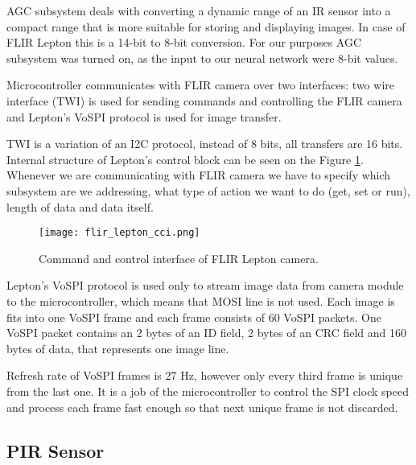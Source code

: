 AGC subsystem deals with converting a dynamic range of an IR sensor into a compact range that is more suitable for storing and displaying images.
In case of FLIR Lepton this is a 14-bit to 8-bit conversion.
For our purposes AGC subsystem was turned on, as the input to our neural network were 8-bit values.

Microcontroller communicates with FLIR camera over two interfaces: two wire interface (TWI) is used for sending commands and controlling the FLIR camera and Lepton's VoSPI protocol is used for image transfer.

TWI is a variation of an I2C protocol, instead of 8 bits, all transfers are 16 bits.
Internal structure of Lepton's control block can be seen on the Figure \ref{flir_lepton_cci}.
Whenever we are communicating with FLIR camera we have to specify which subsystem are we addressing, what type of action we want to do (get, set or run), length of data and data itself.

\begin{figure}[ht]
        \centering
        \texttt{[image: flir\_lepton\_cci.png]} 
        \caption{ Command and control interface of FLIR Lepton camera.} 
        \label{flir_lepton_cci}
\end{figure}

Lepton's VoSPI protocol is used only to stream image data from camera module to the microcontroller, which means that MOSI line is not used.
Each image is fits into one VoSPI frame and each frame consists of 60 VoSPI packets.
One VoSPI packet contains an 2 bytes of an ID field, 2 bytes of an CRC field and 160 bytes of data\footnotemark, that represents one image line.

Refresh rate of VoSPI frames is 27 \si{\hertz}, however only every third frame is unique from the last one.
It is a job of the microcontroller to control the SPI clock speed and process each frame fast enough so that next unique frame is not discarded.



\subsection{ PIR Sensor}

